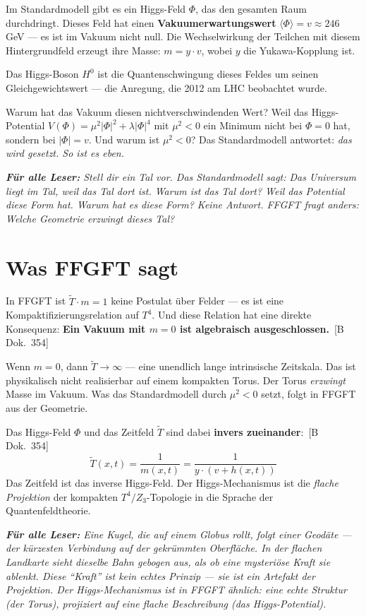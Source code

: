 \documentclass[11pt,oneside]{book}
\newcommand{\status}[1]{\penalty10000\,{\scriptsize\textcolor{gray!60}{[#1]}}}
\newenvironment{laierspur}{%
  \par\vspace{4pt}%
  \noindent\small\itshape\color{blue!60!black}%
  \textbf{Für alle Leser:}\enspace\ignorespaces}{%
  \par\vspace{4pt}\normalsize\normalfont\normalcolor}
\begin{document}
Im Standardmodell gibt es ein Higgs-Feld $\Phi$, das den gesamten Raum
durchdringt. Dieses Feld hat einen \textbf{Vakuumerwartungswert}
$\langle\Phi\rangle = v \approx 246$ GeV --- es ist im Vakuum nicht null.
Die Wechselwirkung der Teilchen mit diesem Hintergrundfeld erzeugt ihre
Masse: $m = y \cdot v$, wobei $y$ die Yukawa-Kopplung ist.

Das Higgs-Boson $H^0$ ist die Quantenschwingung dieses Feldes um seinen
Gleichgewichtswert --- die Anregung, die 2012 am LHC beobachtet wurde.

Warum hat das Vakuum diesen nichtverschwindenden Wert? Weil das
Higgs-Potential $V(\Phi) = \mu^2|\Phi|^2 + \lambda|\Phi|^4$ mit $\mu^2 < 0$
ein Minimum nicht bei $\Phi = 0$ hat, sondern bei $|\Phi| = v$.
Und warum ist $\mu^2 < 0$? Das Standardmodell antwortet: \textit{das
wird gesetzt. So ist es eben.}

\begin{laierspur}
Stell dir ein Tal vor. Das Standardmodell sagt: Das Universum liegt im
Tal, weil das Tal dort ist. Warum ist das Tal dort? Weil das Potential
diese Form hat. Warum hat es diese Form? Keine Antwort.
FFGFT fragt anders: Welche Geometrie erzwingt dieses Tal?
\end{laierspur}

\section*{Was FFGFT sagt}

In FFGFT ist $\tilde{T} \cdot m = 1$ keine Postulat über Felder ---
es ist eine Kompaktifizierungsrelation auf $T^4$. Und diese Relation
hat eine direkte Konsequenz: \textbf{Ein Vakuum mit $m = 0$ ist
algebraisch ausgeschlossen.} \status{B Dok.~354}

Wenn $m = 0$, dann $\tilde{T} \to \infty$ --- eine unendlich lange
intrinsische Zeitskala. Das ist physikalisch nicht realisierbar auf
einem kompakten Torus. Der Torus \textit{erzwingt} Masse im Vakuum.
Was das Standardmodell durch $\mu^2 < 0$ setzt, folgt in FFGFT aus
der Geometrie.

Das Higgs-Feld $\Phi$ und das Zeitfeld $\tilde{T}$ sind dabei
\textbf{invers zueinander}: \status{B Dok.~354}
\[
  \tilde{T}(x,t) = \frac{1}{m(x,t)} = \frac{1}{y \cdot (v + h(x,t))}
\]
Das Zeitfeld ist das inverse Higgs-Feld. Der Higgs-Mechanismus ist die
\textit{flache Projektion} der kompakten $T^4/Z_3$-Topologie in die
Sprache der Quantenfeldtheorie.

\begin{laierspur}
Eine Kugel, die auf einem Globus rollt, folgt einer Geodäte ---
der kürzesten Verbindung auf der gekrümmten Oberfläche. In der
flachen Landkarte sieht dieselbe Bahn gebogen aus, als ob eine
mysteriöse Kraft sie ablenkt. Diese ``Kraft'' ist kein echtes Prinzip ---
sie ist ein Artefakt der Projektion. Der Higgs-Mechanismus ist in FFGFT
ähnlich: eine echte Struktur (der Torus), projiziert auf eine flache
Beschreibung (das Higgs-Potential).
\end{laierspur}
\end{document}
